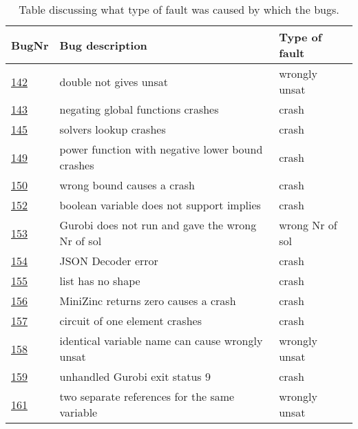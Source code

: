 \begin{table}[]
	\caption{Table discussing what type of fault was caused by which the bugs.}
	\label{tab:bug:fault}
	\centering
	\begin{tabular}{lll}
		\hline
		BugNr & Bug description                                           & Type of fault   \\ \toprule
		\href{https://github.com/CPMpy/cpmpy/issues/142}{142} & double not gives unsat                            & wrongly unsat   \\
		\href{https://github.com/CPMpy/cpmpy/issues/143}{143} & negating global functions crashes                 & crash           \\
		\href{https://github.com/CPMpy/cpmpy/issues/145}{145} & solvers lookup crashes                            & crash           \\
		\href{https://github.com/CPMpy/cpmpy/issues/149}{149} & power function with negative lower bound crashes  & crash           \\
		\href{https://github.com/CPMpy/cpmpy/issues/150}{150} & wrong bound causes a crash                  & crash           \\
		\href{https://github.com/CPMpy/cpmpy/issues/152}{152} & boolean variable does not support implies         & crash           \\
		\href{https://github.com/CPMpy/cpmpy/issues/153}{153} & Gurobi does not run and gave the wrong Nr of sol  & wrong Nr of sol \\
		\href{https://github.com/CPMpy/cpmpy/issues/154}{154} & JSON Decoder error                                & crash           \\
		\href{https://github.com/CPMpy/cpmpy/issues/155}{155} & list has no shape                                 & crash           \\
		\href{https://github.com/CPMpy/cpmpy/issues/156}{156} & MiniZinc returns zero causes a crash              & crash           \\
		\href{https://github.com/CPMpy/cpmpy/issues/157}{157} & circuit of one element crashes                    & crash           \\
		\href{https://github.com/CPMpy/cpmpy/issues/158}{158} & identical variable name can cause wrongly unsat   & wrongly unsat   \\
		\href{https://github.com/CPMpy/cpmpy/issues/159}{159} & unhandled Gurobi exit status 9                    & crash           \\
		\href{https://github.com/CPMpy/cpmpy/issues/161}{161} & two separate references for the same variable     & wrongly unsat   \\

\end{tabular}
\end{table}

